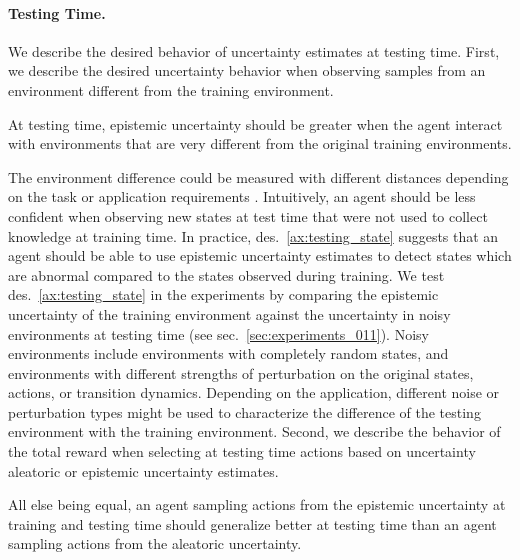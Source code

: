 \paragraph{Testing Time.} We describe the desired behavior of uncertainty estimates at testing time. First, we describe the desired uncertainty behavior when observing samples from an environment different from the training environment.
\begin{desiderata}
    \label{ax:testing_state}
    At testing time, epistemic uncertainty should be greater when the agent interact with environments that are very different from the original training environments.
\end{desiderata}
\vspace{-2mm}
The environment difference could be measured with different distances depending on the task or application requirements \cite{domain-shifts-rl}. Intuitively, an agent should be less confident when observing new states at test time that were not used to collect knowledge at training time. In practice, des.~\ref{ax:testing_state} suggests that an agent should be able to use epistemic uncertainty estimates to detect states which are abnormal compared to the states observed during training. We test des.~\ref{ax:testing_state} in the experiments by comparing the epistemic uncertainty of the training environment against the uncertainty in noisy environments at testing time (see sec.~\ref{sec:experiments_011}). Noisy environments include environments with completely random states, and environments with different strengths of perturbation on the original states, actions, or transition dynamics. Depending on the application, different noise or perturbation types might be used to characterize the difference of the testing environment with the training environment. Second, we describe the behavior of the total reward when selecting at testing time actions based on uncertainty aleatoric or epistemic uncertainty estimates.
\begin{desiderata}
    \label{ax:testing_strategy}
    All else being equal, an agent sampling actions from the epistemic uncertainty at training and testing time should generalize better at testing time than an agent sampling actions from the aleatoric uncertainty.
\end{desiderata}
\vspace{-2mm}
